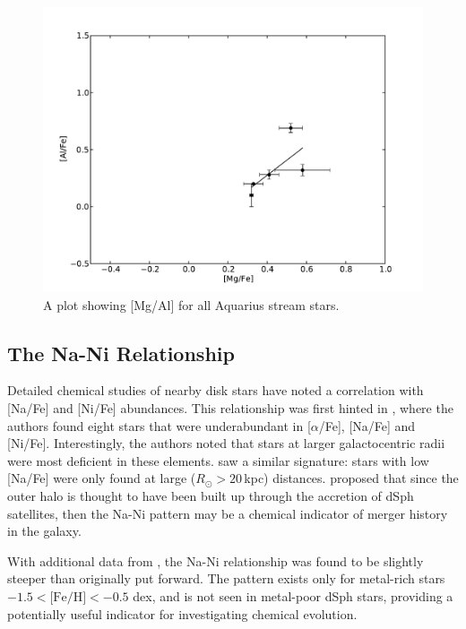 \documentclass{emulateapj}
\begin{document}




\begin{figure}[h]
	\includegraphics[width=\columnwidth]{./figures/aquarius-mg-al.pdf}
	\caption{A plot showing [Mg/Al] for all Aquarius stream stars.}
	\label{fig:mg-al}
\end{figure}

\subsection{The Na-Ni Relationship}

Detailed chemical studies of nearby disk stars have noted a correlation with [Na/Fe] and [Ni/Fe] abundances. This relationship was first hinted in \citet{nissen;schuster_1997}, where the authors found eight stars that were underabundant in [$\alpha$/Fe], [Na/Fe] and [Ni/Fe]. Interestingly, the authors noted that stars at larger galactocentric radii were most deficient in these elements. \citet{fulbright_2000} saw a similar signature: stars with low [Na/Fe] were only found at large ($R_\odot > 20$\,kpc) distances. \citet{nissen;schuster_1997} proposed that since the outer halo is thought to have been built up through the accretion of dSph satellites, then the Na-Ni pattern may be a chemical indicator of merger history in the galaxy.

With additional data from \citet{nissen;schuster_2011}, the Na-Ni relationship was found to be slightly steeper than originally put forward. The pattern exists only for metal-rich stars $-1.5 < \mbox{[Fe/H]} < -0.5$ dex, and is not seen in metal-poor dSph stars, providing a potentially useful indicator for investigating chemical evolution. 
\end{document}

